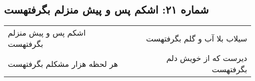 \begin{center}
\section*{شماره ۲۱: اشکم پس و پیش منزلم بگرفتهست}
\label{sec:021}
\begin{longtable}{l p{0.5cm} r}
اشکم پس و پیش منزلم بگرفتهست
&&
سیلاب بلا آب و گلم بگرفتهست
\\
هر لحظه هزار مشکلم بگرفتهست
&&
دیرست که از خویش دلم بگرفتهست
\\
\end{longtable}
\end{center}
